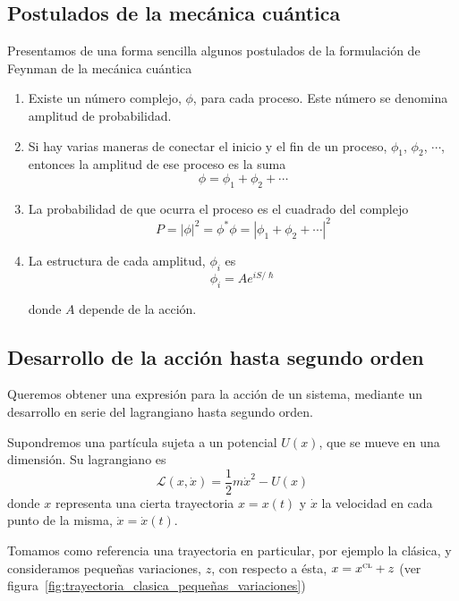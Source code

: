 \subsection{Postulados de la mecánica cuántica}
Presentamos de una forma sencilla algunos postulados de la
formulación de Feynman de la mecánica cuántica
\begin{enumerate}
\item Existe un número complejo, $\phi$, para cada proceso. Este
  número se denomina amplitud de probabilidad.
\item Si hay varias maneras de conectar el inicio y el fin de un
  proceso, $\phi_1$, $\phi_2$, $\cdots$, entonces la amplitud de ese
  proceso es la suma
  \[
    \phi = \phi_1 + \phi_2 + \cdots
  \]

\item La probabilidad de que ocurra el proceso es el cuadrado del complejo
  \[
    P = |\phi|^2 = \phi^* \phi = |\phi_1 + \phi_2 + \cdots|^2
  \]

\item La estructura de cada amplitud, $\phi_i$ es
  \[
    \phi_i = A e^{i S/\hslash}
  \]

  donde $A$ depende de la acción.
\end{enumerate}

\subsection{Desarrollo de la acción hasta segundo orden}
Queremos obtener una expresión para la acción de un sistema, mediante
un desarrollo en serie del lagrangiano hasta segundo orden.

Supondremos una partícula sujeta a un potencial $U(x)$, que se
mueve en una dimensión. Su lagrangiano es
\[
  \mathcal{L}(x,\dot{x})
  =
  \dfrac{1}{2}m\dot{x}^2 - U(x)
\]
donde $x$ representa una cierta trayectoria $x=x(t)$ y $\dot{x}$ la
velocidad en cada punto de la misma, $\dot{x}=\dot{x}(t)$.

Tomamos como referencia una trayectoria en particular, por ejemplo la
clásica, y consideramos pequeñas variaciones, $z$, con respecto a
ésta, $x = x^{\textsc{cl}} + z$ (ver
figura~\ref{fig:trayectoria_clasica_pequeñas_variaciones})


